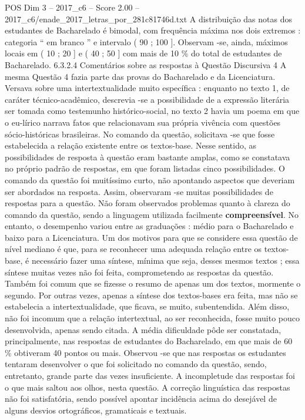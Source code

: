\begin{textsample}{POS Dim 3 – 2017\_c6 – Score 2.00 – 2017\_c6/enade\_2017\_letras\_por\_281c81746d.txt}
A distribuição das notas dos estudantes de Bacharelado é bimodal, com frequência máxima nos dois extremos : categoria “ em branco ” e intervalo ( 90 ; 100 ].
Observam -se, ainda, máximos locais em ( 10 ; 20 ] e ( 40 ; 50 ] com mais de 10 \% do total de estudantes de Bacharelado. 6.3.2.4 Comentários sobre as respostas à Questão Discursiva 4 A mesma Questão 4 fazia parte das provas do Bacharelado e da Licenciatura.
Versava sobre uma intertextualidade muito específica : enquanto no texto 1, de caráter técnico-acadêmico, descrevia -se a possibilidade de a expressão literária ser tomada como testemunho histórico-social, no texto 2 havia um poema em que o eu-lírico narrava fatos que relacionavam sua própria vivência com questões sócio-históricas brasileiras.
No comando da questão, solicitava -se que fosse estabelecida a relação existente entre os textos-base.
Nesse sentido, as possibilidades de resposta à questão eram bastante amplas, como se constatava no próprio padrão de respostas, em que foram listadas cinco possibilidades.
O comando da questão foi muitíssimo curto, não apontando aspectos que deveriam ser abordados na resposta.
Assim, observaram -se muitas possibilidades de respostas para a questão.
Não foram observados problemas quanto à clareza do comando da questão, sendo a linguagem utilizada facilmente \textbf{compreensível}.
No entanto, o desempenho variou entre as graduações : médio para o Bacharelado e baixo para a Licenciatura.
Um dos motivos para que se considere essa questão de nível mediano é que, para se reconhecer uma adequada relação entre os textos-base, é necessário fazer uma síntese, mínima que seja, desses mesmos textos ; essa síntese muitas vezes não foi feita, comprometendo as respostas da questão.
Também foi comum que se fizesse o resumo de apenas um dos textos, mormente o segundo.
Por outras vezes, apenas a síntese dos textos-bases era feita, mas não se estabelecia a intertextualidade, que ficava, se muito, subentendida.
Além disso, não foi incomum que a relação intertextual, ao ser reconhecida, fosse muito pouco desenvolvida, apenas sendo citada.
A média dificuldade pôde ser constatada, principalmente, nas respostas de estudantes do Bacharelado, em que mais de 60 \% obtiveram 40 pontos ou mais.
Observou -se que nas respostas os estudantes tentaram desenvolver o que foi solicitado no comando da questão, sendo, entretanto, grande parte das vezes insuficiente.
A incompletude das respostas foi o que mais saltou aos olhos, nesta questão.
A correção linguística das respostas não foi satisfatória, sendo possível apontar incidência acima do desejável de alguns desvios ortográficos, gramaticais e textuais.

\end{textsample}
